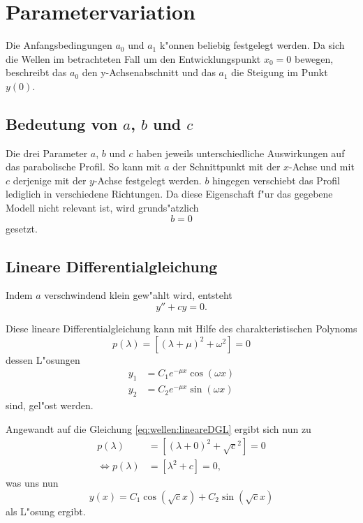\section{Parametervariation}
\label{sec:wellen:parametervariation}

Die Anfangsbedingungen $a_0$ und $a_1$ k"onnen beliebig festgelegt werden. Da 
sich die Wellen im betrachteten Fall um den Entwicklungspunkt $x_0=0$ bewegen, 
beschreibt das $a_0$ den y-Achsenabschnitt und das $a_1$ die Steigung im Punkt 
$y(0)$.

\subsection{Bedeutung von \texorpdfstring{$a$}{a}, \texorpdfstring{$b$}{b} und 
\texorpdfstring{$c$}{c}}
Die drei Parameter $a$, $b$ und $c$ haben jeweils unterschiedliche Auswirkungen 
auf das parabolische Profil. So kann mit $a$ der Schnittpunkt mit der $x$-Achse 
und mit $c$ derjenige mit der $y$-Achse festgelegt werden. $b$ hingegen 
verschiebt das Profil lediglich in verschiedene Richtungen. Da diese 
Eigenschaft f"ur das gegebene Modell nicht relevant ist, wird grunds"atzlich
\begin{equation*}
	b = 0
\end{equation*}
gesetzt.

\subsection{Lineare Differentialgleichung}
\label{subsec:wellen:linearedifferntialgleichung}

Indem $a$ verschwindend klein gew"ahlt wird, entsteht
\begin{equation}
	y''+ cy = 0.
	\label{eq:wellen:lineareDGL}
\end{equation}

Diese lineare Differentialgleichung kann mit Hilfe des charakteristischen 
Polynoms
\begin{equation*}
	p(\lambda) = [(\lambda+\mu)^2+\omega^2] = 0
\end{equation*}
dessen L"osungen
\begin{equation*}
\begin{split}
	y_1 &= C_1e^{-\mu x}\cos(\omega x) \\
	y_2 &= C_2e^{-\mu x}\sin(\omega x)
\end{split}
\end{equation*}
sind, gel"ost werden.

Angewandt auf die Gleichung \ref{eq:wellen:lineareDGL} ergibt sich nun zu
\begin{equation*}
\begin{split}
	p(\lambda) &= [(\lambda+0)^2+\sqrt{c}^2] = 0 \\
	\Leftrightarrow p(\lambda) &= [\lambda^2+c] = 0,
\end{split}
\end{equation*}
was uns nun
\begin{equation}
y(x) = C_1 \cos(\sqrt{c}x) + C_2 \sin(\sqrt{c}x)
\label{eq:wellen:loesunglinearedgl}
\end{equation}
als L"osung ergibt.


